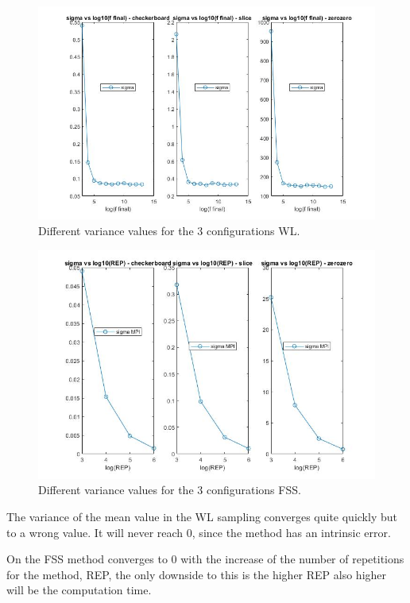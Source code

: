 \documentclass[a4paper, 11pt]{article}
\begin{document}
	\begin{figure}[h]
		\includegraphics[scale=0.3]{sigma_WL}
		\centering
		\caption{Different variance values for the 3 configurations WL.}
	\end{figure}
	
	\begin{figure}[h]
		\includegraphics[scale=0.3]{sigma_new_rps}
		\centering
		\caption{Different variance values for the 3 configurations FSS.}
	\end{figure}

	The variance of the mean value in the WL sampling converges quite quickly but to a wrong value. It will never reach 0, since the method has an intrinsic error.
	
	 On the FSS method converges to 0 with the increase of the number of repetitions for the method, REP, the only downside to this is the higher REP also higher will be the computation time. 
	 
\end{document}
